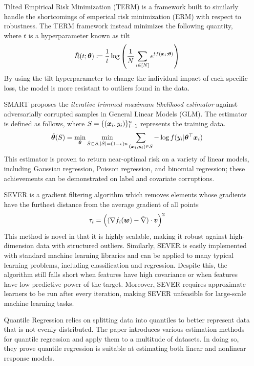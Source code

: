 \documentclass{article} %
\begin{document}
	Tilted Empirical Risk Minimization (TERM) \cite{li2020tilted} is a framework built to similarly handle the shortcomings of emperical risk minimization (ERM) with respect to robustness. The TERM framework instead minimizes the following quantity, where $t$ is a hyperparameter known as tilt
	\begin{equation}
		\tilde{R}(t;{\bm{\theta}}) \coloneqq \frac{1}{t} \log\left(\frac{1}{N}\sum_{i \in \left[N\right]}e^{tf({\bm{x}}_i;{\bm{\theta}})} \right)
	\end{equation}
	By using the tilt hyperparameter to change the individual impact of each specific loss, the model is more resistant to outliers found in the data.
	
	SMART \cite{https://doi.org/10.48550/arxiv.2206.04777} proposes the \textit{iterative trimmed maximum likelihood estimator} against adversarially corrupted samples in General Linear Models (GLM). The estimator is defined as follows, where $S = \{({\bm{x}}_i,y_i)\}_{i=1}^n$ represents the training data. \vspace{1em}
	\begin{equation}
		\hat{{\bm{\theta}}}(S) = \min_{{\bm{\theta}}} \min_{\hat{S} \subset S, |\hat{S}| = (1-{\epsilon})n} \sum_{({\bm{x}}_i,y_i) \in S} -\log f(y_i|{\bm{\theta}}^\top{\bm{x}}_i)
	\end{equation}
	This estimator is proven to return near-optimal risk on a variety of linear models, including Gaussian regression, Poisson regression, and binomial regression; these achievements can be demonstrated on label and covariate corruptions.
	
	
	SEVER \cite{DiakonikolasKKLSS19} is a gradient filtering algorithm which removes elements whose gradients have the furthest distance from the average gradient of all points
	\begin{equation}
		\tau_i = \left((\nabla f_i({\bm{w}}) - \hat{\nabla})\cdot {\bm{v}}\right)^2
	\end{equation}
	This method is novel in that it is highly scalable, making it robust against high-dimension data with structured outliers. Similarly, SEVER is easily implemented with standard machine learning libraries and can be applied to many typical learning problems, including classification and regression. Despite this, the algorithm still falls short when features have high covariance or when features have low predictive power of the target. Moreover, SEVER requires approximate learners to be run after every iteration, making SEVER unfeasible for large-scale machine learning tasks. 
	
	Quantile Regression \cite{yu_quantile_2003} relies on splitting data into quantiles to better represent data that is not evenly distributed. The paper introduces various estimation methods for quantile regression and apply them to a multitude of datasets. In doing so, they prove quantile regression is suitable at estimating both linear and nonlinear response models.
	
\end{document}
